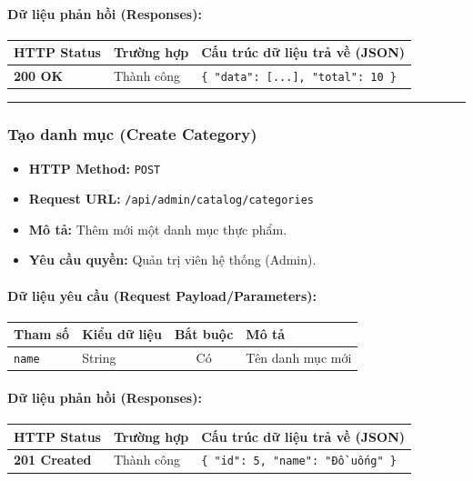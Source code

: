 \documentclass[12pt,a4paper]{article}
\begin{document}
\paragraph{Dữ liệu phản hồi (Responses):}
\begin{longtable}{|p{2.8cm}|p{3.2cm}|p{8.0cm}|}
\hline
\textbf{HTTP Status} & \textbf{Trường hợp} & \textbf{Cấu trúc dữ liệu trả về (JSON)} \\ \hline
\endhead
\textbf{200 OK} & Thành công & \texttt{\{ "data": [...], "total": 10 \}} \\ \hline
\end{longtable}

\vskip 0.4cm
\noindent\rule{\textwidth}{0.3pt}
\vskip 0.4cm

\subsubsection{Tạo danh mục (Create Category)}
\begin{itemize}[leftmargin=*]
    \item \textbf{HTTP Method:} \texttt{POST}
    \item \textbf{Request URL:} \texttt{/api/admin/catalog/categories}
    \item \textbf{Mô tả:} Thêm mới một danh mục thực phẩm.
    \item \textbf{Yêu cầu quyền:} Quản trị viên hệ thống (Admin).
\end{itemize}

\paragraph{Dữ liệu yêu cầu (Request Payload/Parameters):}
\begin{longtable}{|p{2.8cm}|p{2.2cm}|c|p{7.0cm}|}
\hline
\textbf{Tham số} & \textbf{Kiểu dữ liệu} & \textbf{Bắt buộc} & \textbf{Mô tả} \\ \hline
\endhead
\texttt{name} & String & Có & Tên danh mục mới \\ \hline
\end{longtable}

\paragraph{Dữ liệu phản hồi (Responses):}
\begin{longtable}{|p{2.8cm}|p{3.2cm}|p{8.0cm}|}
\hline
\textbf{HTTP Status} & \textbf{Trường hợp} & \textbf{Cấu trúc dữ liệu trả về (JSON)} \\ \hline
\endhead
\textbf{201 Created} & Thành công & \texttt{\{ "id": 5, "name": "Đồ uống" \}} \\ \hline
\end{longtable}
\end{document}
